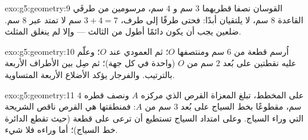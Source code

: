 \begin{solution}{exo:g5:geometry:9}
القوسان نصفا قطريهما $3$ سم و $4$ سم، مرسومين من طرفَي القاعدة
$8$ سم، لا يلتقيان أبدًا: فحتى طرفًا إلى طرف، $3 + 4 = 7$ سم لا
تمتد عبر $8$ سم.  ضلعين يجب أن يكون دائمًا أطول من
الثالث --- وإلا لم ينغلق المثلث.
\end{solution}

\begin{solution}{exo:g5:geometry:10}
اُرسم قطعة من $6$ سم ومنتصفها $O$؛ ثم العمودي
عند $O$؛ وعلّم عليه نقطتين على بُعد $2$ سم من $O$ (واحدة
في كل جهة)؛ ثم صِل بين الأطراف الأربعة بالترتيب. والفرجار
يؤكد الأضلاع الأربعة المتساوية.
\end{solution}

\begin{solution}{exo:g5:geometry:11}
على المخطط، تبلغ المعزاة القرص الذي مركزه $A$ ونصف قطره
$4$ سم، مقطوعًا بخط السياج على بُعد $3$ سم من $A$: فمنطقتها هي
القرص ناقص الشريحة التي وراء السياج. وعلى امتداد السياج تستطيع
أن ترعى على قطعة (حيث تقطع الدائرة خط السياج)؛
أما وراءه فلا شيء.
\end{solution}
